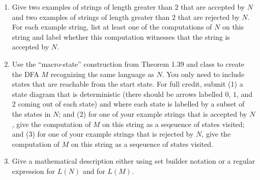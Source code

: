 \begin{enumerate}[wide, labelwidth=!, labelindent=0pt]

    \begin{enumerate}
      \item\gradeCompleteFirst Give two examples of strings of length greater than $2$ 
      that are accepted by $N$ and two examples of strings of length greater than $2$ 
      that are rejected by $N$. For each example string, list at least one of the 
      computations of $N$ on this string and 
      label whether this computation witnesses that the string is accepted by $N$.

      \item\gradeCorrectFirst Use the ``macro-state'' construction from Theorem 1.39 and class to create the DFA
      $M$ recognizing the same language as $N$. You only need to include states that are reachable from the start
      state. For full credit, submit (1) a state diagram that is deterministic (there should be arrows labelled $0$, $1$, and 
      $2$ coming out of each state) and where each state is labelled by a subset of the states in $N$; 
      and (2) for one of your example strings that is accepted by $N$, give the computation of $M$ on this string as a 
      seqeuence of states visited; and (3) for one of your example strings that is rejected by $N$, 
      give the computation of $M$ on this string as a seqeuence of states visited.

      \item\gradeComplete Give a mathematical description either using set builder notation or a regular expression
      for $L(N)$ and for $L(M)$.
    \end{enumerate}
\end{enumerate}
